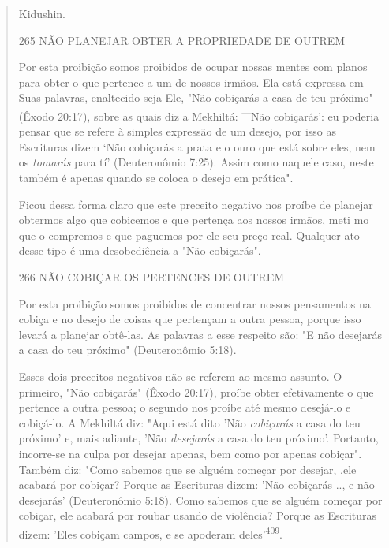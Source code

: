 \begin{quote}
Kidushin.

265 NÃO PLANEJAR OBTER A PROPRIEDADE DE OUTREM

Por esta proibição somos proibidos de ocupar nossas mentes com planos
para obter o que pertence a um de nossos irmãos. Ela está expressa em
Suas palavras, enaltecido seja Ele, "Não cobiçarás a casa de teu
próximo" (Êxo­do 20:17), sobre as quais diz a Mekhiltá:
\textsuperscript{---}Não cobiçarás': eu poderia pensar que se refere à
simples expressão de um desejo, por isso as Escrituras dizem `Não
cobiçarás a prata e o ouro que está sobre eles, nem os \emph{tomarás}
para tí' (Deuteronômio 7:25). Assim como naquele caso, neste também é
apenas quan­do se coloca o desejo em prática".

Ficou dessa forma claro que este preceito negativo nos proíbe de
planejar obtermos algo que cobicemos e que pertença aos nossos irmãos,
meti mo que o compremos e que paguemos por ele seu preço real. Qualquer
ato desse tipo é uma desobediência a "Não cobiçarás".

266 NÃO COBIÇAR OS PERTENCES DE OUTREM

Por esta proibição somos proibidos de concentrar nossos pensamen­tos na
cobiça e no desejo de coisas que pertençam a outra pessoa, porque isso
levará a planejar obtê-las. As palavras a esse respeito são: "E não
desejarás a casa do teu próximo" (Deuteronômio 5:18).

Esses dois preceitos negativos não se referem ao mesmo assunto. O
primeiro, "Não cobiçarás" (Êxodo 20:17), proíbe obter efetivamente o que
per­tence a outra pessoa; o segundo nos proíbe até mesmo desejá-lo e
cobiçá-lo. A Mekhiltá diz: "Aqui está dito 'Não \emph{cobiçarás} a casa
do teu próximo' e, mais adiante, 'Não \emph{desejarás} a casa do teu
próximo'. Portanto, incorre-se na culpa por desejar apenas, bem como por
apenas cobiçar". Também diz: "Como sa­bemos que se alguém começar por
desejar, .ele acabará por cobiçar? Porque as Escrituras dizem: 'Não
cobiçarás .., e não desejarás' (Deuteronômio 5:18). Como sabemos que se
alguém começar por cobiçar, ele acabará por roubar usan­do de violência?
Porque as Escrituras dizem: 'Eles cobiçam campos, e se apo­deram
deles'\textsuperscript{409}.


\end{quote}
